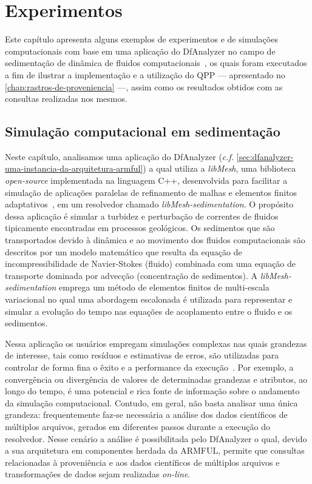 

\chapter{Experimentos}%
\label{chap:experimentos}

Este capítulo apresenta alguns exemplos de experimentos e de simulações computacionais com base em uma aplicação do DfAnalyzer no campo de sedimentação de dinâmica de fluidos computacionais~\cite{silva2016situ}, os quais foram executados a fim de ilustrar a implementação e a utilização do QPP --- apresentado no \autoref{chap:rastros-de-proveniencia} ---, assim como os resultados obtidos com as consultas realizadas nos mesmos.

\section{Simulação computacional em sedimentação}

Neste capítulo, analisamos uma aplicação do DfAnalyzer (\textit{c.f.} \autoref{sec:dfanalyzer-uma-instancia-da-arquitetura-armful}) a qual utiliza a \textit{libMesh}, uma biblioteca \textit{open-source} implementada na linguagem C++, desenvolvida para facilitar a simulação de aplicações paralelas de refinamento de malhas e elementos finitos adaptativos~\cite{boncz2008breaking}, em um resolvedor chamado \textit{libMesh-sedimentation}. O propósito dessa aplicação é simular a turbidez e perturbação de correntes de fluidos tipicamente encontradas em processos geológicos. Os sedimentos que são transportados devido à dinâmica e ao movimento dos fluidos computacionais são descritos por um modelo matemático que resulta da equação de incompressibilidade de Navier-Stokes (fluido) combinada com uma equação de transporte dominada por advecção (concentração de sedimentos). A \textit{libMesh-sedimentation} emprega um método de elementos finitos de multi-escala variacional no qual uma abordagem escalonada é utilizada para representar e simular a evolução do tempo nas equações de acoplamento entre o fluido e os sedimentos. 

Nessa aplicação os usuários empregam simulações complexas nas quais grandezas de interesse, tais como resíduos e estimativas de erros, são utilizadas para controlar de forma fina o êxito e a performance da execução~\cite{silva2016situ}. Por exemplo, a convergência ou divergência de valores de determinadas grandezas e atributos, ao longo do tempo, é uma potencial e rica fonte de informação sobre o andamento da simulação computacional. Contudo, em geral, não basta analisar uma única grandeza: frequentemente faz-se necessária a análise dos dados científicos de múltiplos arquivos, gerados em diferentes passos durante a execução do resolvedor. Nesse cenário a análise é possibilitada pelo DfAnalyzer o qual, devido a sua arquitetura em componentes herdada da ARMFUL, permite que consultas relacionadas à proveniência e aos dados científicos de múltiplos arquivos e transformações de dados sejam realizadas \textit{on-line}.

